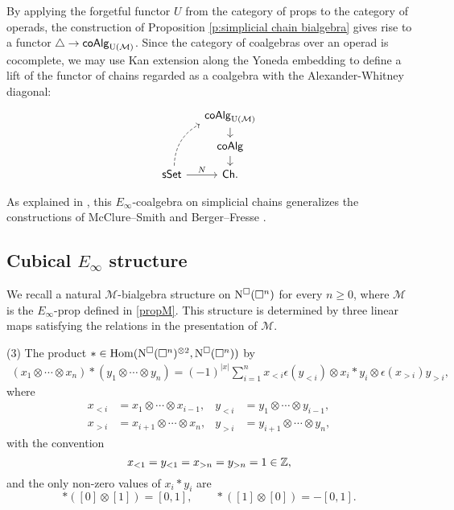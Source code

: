 By applying the forgetful functor $U$ from the category of props to the category of operads, the construction of Proposition \ref{p:simplicial chain bialgebra} gives rise to a functor $\triangle \to \mathsf{coAlg}_{\mathrm{U}(\mathcal{M})}$. Since the category of coalgebras over an operad is cocomplete, we may use Kan extension along the Yoneda embedding to define a lift of the functor of chains regarded as a coalgebra with the Alexander-Whitney diagonal:
\begin{equation*}
\begin{tikzcd}[column sep=small, row sep=small]
& \coAlg_\UM \arrow[d] \\
& \coAlg \arrow[d] \\
\sSet \arrow[r, "N"] \arrow[dashed, uur, bend left]& \Ch.
\end{tikzcd}
\end{equation*}

As explained in \cite{medina2020prop1}, this $E_\infty$-coalgebra on simplicial chains generalizes the constructions of McClure--Smith \cite{mcclure2003multivariable} and Berger--Fresse \cite{berger2004combinatorial}.

\subsection{Cubical $E_\infty$ structure}

We recall a natural $\mathcal M$-bialgebra structure on $\operatorname{N^{\square}}(\square^n)$ for every $n \geq 0$, where $\mathcal M$ is the $E_{\infty}$-prop defined in \ref{propM}. This structure is determined by three linear maps satisfying the relations in the presentation of $\mathcal M$.


(3) The product $\ast \in \mathrm{Hom}(\operatorname{N^{\square}}(\square^n)^{\otimes 2}, \operatorname{N^{\square}}(\square^n))$ by
\begin{align*}
(x_1 \otimes \cdots \otimes x_n) \ast (y_1 \otimes \cdots \otimes y_n) =
(-1)^{|x|} \sum_{i=1}^n x_{<i} \epsilon(y_{<i}) \otimes x_i \ast y_i \otimes \epsilon(x_{>i})y_{>i},
\end{align*}
where
\begin{align*}
x_{<i} & = x_1 \otimes \cdots \otimes x_{i-1}, &
y_{<i} & = y_1 \otimes \cdots \otimes y_{i-1}, \\
x_{>i} & = x_{i+1} \otimes \cdots \otimes x_n, & 
y_{>i} & = y_{i+1} \otimes \cdots \otimes y_n,
\end{align*}
with the convention
\begin{equation*}
x_{<1} = y_{<1} = x_{>n} = y_{>n} = 1 \in \mathbb{Z},
\end{equation*}
and the only non-zero values of $x_i \ast y_i$ are
\begin{equation*}
\ast([0] \otimes [1]) = [0, 1], \qquad  \ast([1] \otimes [0]) = -[0, 1].
\end{equation*}

